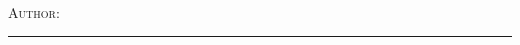 %
\noindent %
%
\begin{minipage}{.40\textwidth}
    {\color{darkred} \faSchool} { \textsc{\college}}{ } {\color{darkred} \faSchool}\\ 
    \small\textsc{ \semester}
\end{minipage}%
\hfill	
\begin{minipage}{0.60\textwidth}%
    \raggedleft%
    {\Large \textsc{\coursetitle}\par}
    \doublerule %
    \textsc{Author}: \instructor\\
\end{minipage}%
\vspace{2.8cm}
{
    \hrule\vspace{.2cm}
    \centering
    {\scshape 
        \Large \color{darkestblue}{\doctitle}\par}
    \vspace{.3cm}    
}

\vspace{1.2cm}
